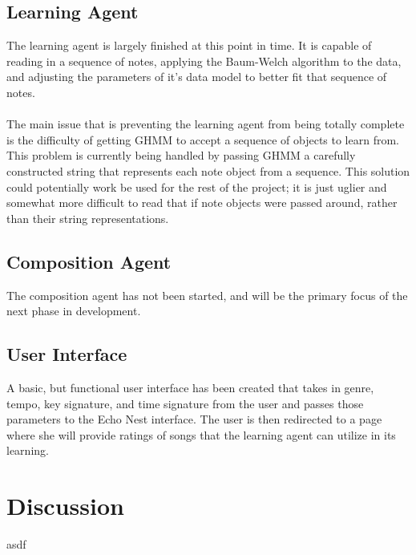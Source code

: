 \documentclass{article}
\begin{document}
\subsection{Learning Agent}
The learning agent is largely finished at this point in time. It is capable of reading in a sequence
of notes, applying the Baum-Welch algorithm to the data, and adjusting the parameters of it's data
model to better fit that sequence of notes.\\
\\
The main issue that is preventing the learning agent from being totally complete is the difficulty
of getting GHMM to accept a sequence of objects to learn from. This problem is currently being
handled by passing GHMM a carefully constructed string that represents each note object from a 
sequence. This solution could potentially work be used for the rest of the project; it is just
uglier and somewhat more difficult to read that if note objects were passed around, rather than
their string representations.

\subsection{Composition Agent}
The composition agent has not been started, and will be the primary focus of the next phase in development.

\subsection{User Interface}
A basic, but functional user interface has been created that takes in genre, tempo, key signature, and time
signature from the user and passes those parameters to the Echo Nest interface. The user is then redirected
to a page where she will provide ratings of songs that the learning agent can utilize in its learning.

\section{Discussion}
asdf
\end{document}
